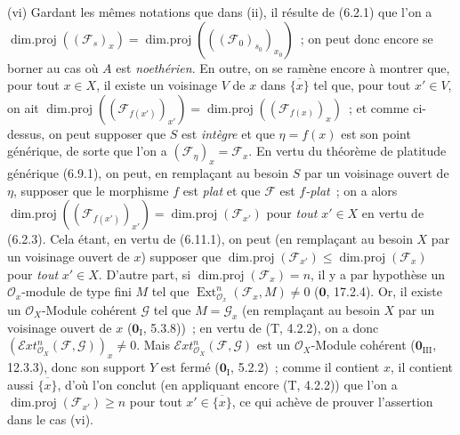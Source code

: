 (vi) Gardant les mêmes notations que dans (ii), il résulte de (6.2.1) que l'on
a
$\operatorname{dim.proj}((\mathcal F_s)_x)=
\operatorname{dim.proj}(((\mathcal F_0)_{s_0})_{x_0})$~;
on peut donc encore se borner au cas où $A$ est \emph{noethérien}. En outre, on
se ramène encore à montrer que, pour tout $x\in X$, il existe un voisinage $V$
de $x$ dans $\overline{\{x\}}$ tel que, pour tout $x'\in V$, on ait
$\operatorname{dim.proj}((\mathcal F_{f(x')})_{x'})=
\operatorname{dim.proj}((\mathcal F_{f(x)})_x)$~;
et comme ci-dessus, on peut supposer que $S$ est \emph{intègre} et que
$\eta=f(x)$ est son point générique, de sorte que l'on a
$(\mathcal F_\eta)_x=\mathcal F_x$. En vertu du théorème de platitude générique
(6.9.1), on peut, en remplaçant au besoin $S$ par un voisinage ouvert de
$\eta$, supposer que le morphisme $f$ est \emph{plat} et que $\mathcal F$ est
\emph{$f$-plat}~; on a alors
$\operatorname{dim.proj}((\mathcal F_{f(x')})_{x'})=
\operatorname{dim.proj}(\mathcal F_{x'})$ pour \emph{tout} $x'\in X$ en vertu de
(6.2.3). Cela étant, en vertu de (6.11.1), on peut (en remplaçant au besoin $X$
par un voisinage ouvert de $x$) supposer que
$\operatorname{dim.proj}(\mathcal F_{x'})\leq
\operatorname{dim.proj}(\mathcal F_x)$ pour \emph{tout} $x'\in X$. D'autre part, si
$\operatorname{dim.proj}(\mathcal F_x)=n$, il y a par hypothèse un
$\mathcal O_x$-module de type fini $M$ tel que
$\operatorname{Ext}_{\mathcal O_x}^n(\mathcal F_x,M)\neq0$
($\mathbf 0$, 17.2.4). Or, il existe un $\mathcal O_X$-Module cohérent
$\mathcal G$ tel que $M=\mathcal G_x$ (en remplaçant au besoin $X$ par un
voisinage ouvert de $x$ ($\mathbf 0_{\mathrm I}$, 5.3.8))~; en vertu de
(T, 4.2.2), on a donc
$(\mathcal{E}xt_{\mathcal O_X}^n(\mathcal F,\mathcal G))_x\neq0$. Mais
$\mathcal{E}xt_{\mathcal O_X}^n(\mathcal F,\mathcal G)$ est un
$\mathcal O_X$-Module cohérent ($\mathbf 0_{\mathrm{III}}$, 12.3.3), donc son
support $Y$ est fermé ($\mathbf 0_{\mathrm I}$, 5.2.2)~; comme il contient $x$,
il contient aussi $\overline{\{x\}}$, d'où l'on conclut (en appliquant encore
(T, 4.2.2)) que l'on a
$\operatorname{dim.proj}(\mathcal F_{x'})\geq n$ pour tout
$x'\in\overline{\{x\}}$, ce qui achève de prouver l'assertion dans le cas (vi).

